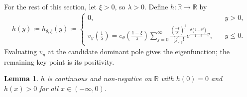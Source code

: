 \documentclass[10pt,a4paper]{amsart}
\newcommand{\R}{\mathbb{R}} %
\newcommand{\1}{\mathds{1}}
\newtheorem{Lemma}[definition]{Lemma}
\begin{document}
For the rest of this section, let $\xi> 0$, so $\lambda>0$. Define $h:\R\to\R$ by
\begin{align}\label{def_h_thetage1}
    h(y)\coloneqq h_{\theta,\xi}(y)\coloneqq  \begin{cases}
          0,~~~&y>0,
          \\ v_y\left(\frac{1}{\lambda}\right)={e_\theta\left(\frac{1-\xi}{\lambda}\right)}\sum_{j=0}^\infty \frac{\left(\frac{-\xi}{\lambda}\right)^{j}}{[j]_\theta!}e^{\frac{\theta(1-\theta^j)}{1-\theta}y},~~~~&y\le 0.
      \end{cases}
  \end{align}
  Evaluating $v_y$ at the candidate dominant pole gives the eigenfunction; the remaining key point is its positivity.
\begin{Lemma}\label{thetage1_h_pos}
$h$ is continuous and non-negative on $\R$ with $h(0)=0$ and $h(x)>0$ for all $x\in(-\infty,0)$.
\end{Lemma}
\end{document}
